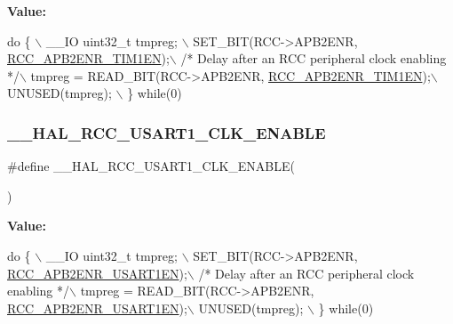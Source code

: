 {\bfseries Value\+:}
\begin{DoxyCode}
\textcolor{keywordflow}{do} \{ \(\backslash\)
                                        \_\_IO uint32\_t tmpreg; \(\backslash\)
                                        SET\_BIT(RCC->APB2ENR, \hyperlink{group___peripheral___registers___bits___definition_ga25852ad4ebc09edc724814de967816bc}{RCC\_APB2ENR\_TIM1EN});\(\backslash\)
                                        \textcolor{comment}{/* Delay after an RCC peripheral clock enabling */}\(\backslash\)
                                        tmpreg = READ\_BIT(RCC->APB2ENR, 
      \hyperlink{group___peripheral___registers___bits___definition_ga25852ad4ebc09edc724814de967816bc}{RCC\_APB2ENR\_TIM1EN});\(\backslash\)
                                        UNUSED(tmpreg); \(\backslash\)
                                      \} \textcolor{keywordflow}{while}(0)
\end{DoxyCode}
\mbox{\label{group___r_c_c___a_p_b2___clock___enable___disable_ga932afe7cea6c567ad63e0f83308b9d3e}} 
\subsubsection{\texorpdfstring{\+\_\+\+\_\+\+H\+A\+L\+\_\+\+R\+C\+C\+\_\+\+U\+S\+A\+R\+T1\+\_\+\+C\+L\+K\+\_\+\+E\+N\+A\+B\+LE}{\_\_HAL\_RCC\_USART1\_CLK\_ENABLE}}
{\footnotesize\ttfamily \#define \+\_\+\+\_\+\+H\+A\+L\+\_\+\+R\+C\+C\+\_\+\+U\+S\+A\+R\+T1\+\_\+\+C\+L\+K\+\_\+\+E\+N\+A\+B\+LE(\begin{DoxyParamCaption}{ }\end{DoxyParamCaption})}

{\bfseries Value\+:}
\begin{DoxyCode}
\textcolor{keywordflow}{do} \{ \(\backslash\)
                                        \_\_IO uint32\_t tmpreg; \(\backslash\)
                                        SET\_BIT(RCC->APB2ENR, 
      \hyperlink{group___peripheral___registers___bits___definition_ga4666bb90842e8134b32e6a34a0f165f3}{RCC\_APB2ENR\_USART1EN});\(\backslash\)
                                        \textcolor{comment}{/* Delay after an RCC peripheral clock enabling */}\(\backslash\)
                                        tmpreg = READ\_BIT(RCC->APB2ENR, 
      \hyperlink{group___peripheral___registers___bits___definition_ga4666bb90842e8134b32e6a34a0f165f3}{RCC\_APB2ENR\_USART1EN});\(\backslash\)
                                        UNUSED(tmpreg); \(\backslash\)
                                      \} \textcolor{keywordflow}{while}(0)
\end{DoxyCode}
